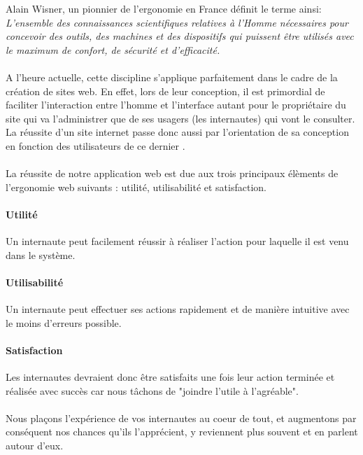 Alain Wisner, un pionnier de l’ergonomie en France définit le terme ainsi:
\textit{L’ensemble des connaissances scientifiques relatives à l’Homme nécessaires pour 
concevoir des outils, des machines et des dispositifs qui puissent être utilisés avec 
le maximum de confort, de sécurité et d’efficacité.}
\paragraph{}
A l’heure actuelle, cette discipline s’applique parfaitement dans le cadre de la 
création de sites web. En effet, lors de leur conception, il est primordial de 
faciliter l’interaction entre l’homme et l’interface autant pour le propriétaire 
du site qui va l’administrer que de ses usagers (les internautes) qui vont le 
consulter. La réussite d’un site internet passe donc aussi par l’orientation 
de sa conception en fonction des utilisateurs de  ce dernier \cite{ergonomie}.  
\paragraph{}
La réussite de notre application web est due aux trois principaux élèments de l'ergonomie 
web suivants : utilité, utilisabilité et satisfaction.
\paragraph{Utilité}
Un internaute peut facilement réussir à réaliser l’action pour laquelle il est venu dans le système.
\paragraph{Utilisabilité}
Un internaute peut effectuer ses actions rapidement et de manière intuitive avec le moins 
d’erreurs possible. 
\paragraph{Satisfaction}
Les internautes devraient donc être satisfaits une fois leur action terminée et réalisée avec succès 
car nous tâchons de "joindre l’utile à l’agréable". 
\paragraph{}
Nous plaçons l’expérience de vos internautes au coeur de tout, et augmentons par conséquent nos chances 
qu’ils l’apprécient, y reviennent plus souvent et en parlent autour d’eux.


